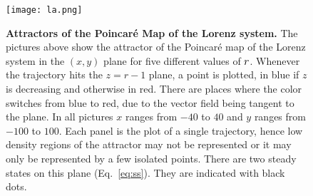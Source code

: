\begin{figure}
 \centering
 \texttt{[image: la.png]}
 \caption{{\bf Attractors of the Poincar\'e Map of the Lorenz system.} 
    The pictures above show the attractor of the Poincar\'e map of the Lorenz system  in the $(x,y)$ plane for five different values of $r$. 
    Whenever the trajectory hits the $z=r-1$ plane, a point is plotted, in blue if $z$ is decreasing and otherwise in red.
    There are places where the color switches from blue to red, due to the vector field being tangent to the plane. 
    In all pictures $x$ ranges from $-40$ to $40$ and $y$ ranges from $-100$ to $100$. 
    Each panel is the plot of a single trajectory, hence low density regions of the attractor may not be represented or it may only be represented by a few isolated points.
    There are two steady states on this plane (Eq.~\ref{eq:ss}). 
    They are indicated with black dots.
 }
 \label{fig:la}
\end{figure} 
